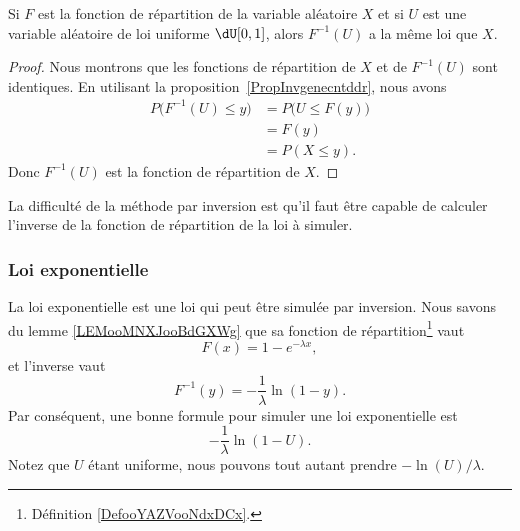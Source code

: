 \begin{proposition}
	Si \( F\) est la fonction de répartition de la variable aléatoire \( X\) et si \( U\) est une variable aléatoire de loi uniforme \( \dU\mathopen[ 0 , 1 \mathclose]\), alors \( F^{-1}(U)\) a la même loi que \( X\).
\end{proposition}

\begin{proof}
	Nous montrons que les fonctions de répartition de \( X\) et de \( F^{-1}(U)\) sont identiques. En utilisant la proposition~\ref{PropInvgenecntddr}, nous avons
	\begin{subequations}
		\begin{align}
			P\big( F^{-1}(U)\leq y \big) & =P\big( U\leq F(y) \big) \\
			                             & =F(y)                    \\
			                             & =P(X\leq y).
		\end{align}
	\end{subequations}
	Donc \( F^{-1}(U)\) est la fonction de répartition de \( X\).
\end{proof}

La difficulté de la méthode par inversion est qu'il faut être capable de calculer l'inverse de la fonction de répartition de la loi à simuler.

\subsubsection{Loi exponentielle}

La loi exponentielle est une loi qui peut être simulée par inversion. Nous savons du lemme \ref{LEMooMNXJooBdGXWg} que sa fonction de répartition\footnote{Définition \ref{DefooYAZVooNdxDCx}.} vaut
\begin{equation}
	F(x)=1- e^{-\lambda x},
\end{equation}
et l'inverse vaut
\begin{equation}
	F^{-1}(y)=-\frac{1}{ \lambda }\ln(1-y).
\end{equation}
Par conséquent, une bonne formule pour simuler une loi exponentielle est
\begin{equation}
	-\frac{1}{ \lambda }\ln(1-U).
\end{equation}
Notez que \( U\) étant uniforme, nous pouvons tout autant prendre \( -\ln(U)/\lambda\).

